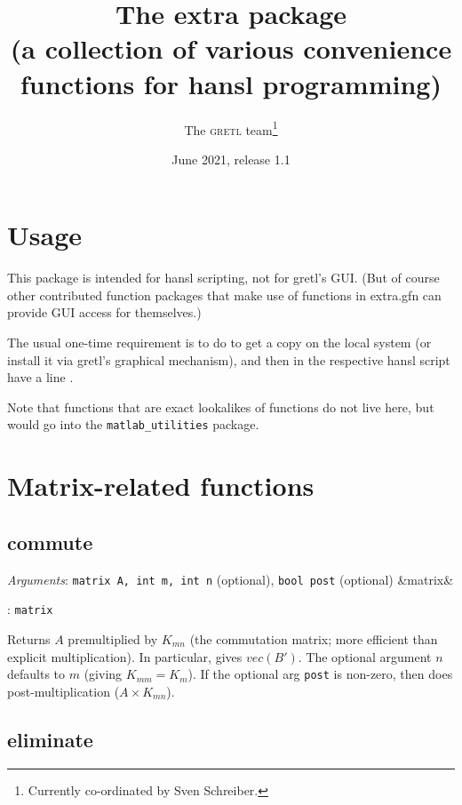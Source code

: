 \documentclass[11pt,english]{article}
\newcommand{\noun}[1]{\textsc{#1}}
\newcommand{\ArgRet}[2]{%
  {\it Arguments}: {#1}%
  \ifx&#2&%
  \else
  \par\smallskip\noindent {\it Return type}: \texttt{#2}
  \fi%
  \par\medskip\par%
  }
\begin{document}
\title{The extra package\\
(a collection of various convenience functions for hansl programming) }

\date{June 2021, release 1.1}

\author{The \noun{gretl} team\thanks{Currently co-ordinated by Sven Schreiber.}}

\maketitle
\tableofcontents{}

\section{Usage}

This package is intended for hansl scripting, not for gretl's GUI.
(But of course other contributed function packages that make use of
functions in extra.gfn can provide GUI access for themselves.)

The usual one-time requirement is to do 
to get a copy on the local system (or install it via gretl's graphical
mechanism), and then in the respective hansl script have a line .

Note that functions that are exact lookalikes of 
functions do not live here, but would go into the
\texttt{matlab\_utilities} package.


\section{Matrix-related functions}

\subsection{commute}

\ArgRet{\texttt{matrix A, int m, int n} (optional), \texttt{bool
post} (optional)}{matrix}

Returns $A$ premultiplied by $K_{mn}$ (the commutation matrix; more
efficient than explicit multiplication). In particular,  gives $vec(B')$. The optional argument $n$ defaults to
$m$ (giving $K_{mm}=K_{m}$). If the optional arg \texttt{post} is
non-zero, then does post-multiplication ($A\times K_{mn}$).

\subsection{eliminate}
\end{document}
